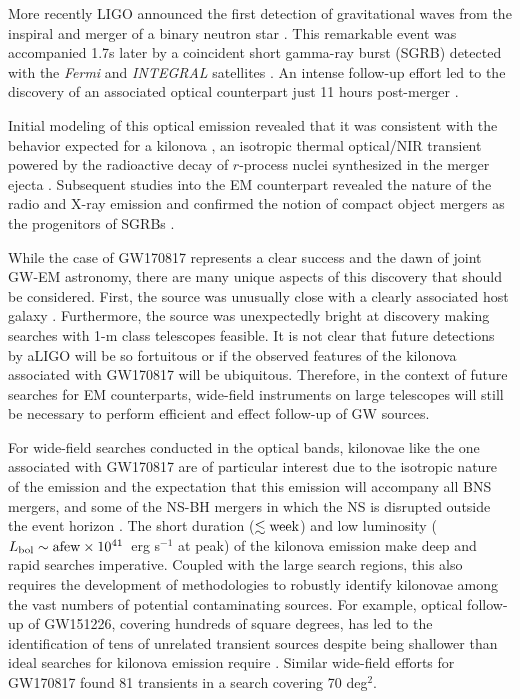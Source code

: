 More recently LIGO announced the first detection of gravitational waves from the inspiral and merger of a binary neutron star \citep[GW170817][]{gw170817}. This remarkable event was accompanied 1.7s later by a coincident short gamma-ray burst (SGRB) detected with the {\it Fermi} and {\it INTEGRAL} satellites \citep{ligogrb,ligofermi,ligointegral}. An intense follow-up effort led to the discovery of an associated optical counterpart just 11 hours post-merger \citep{mmapaper,gw170817lco,gw170817swope,ss+17,gw170817dlt40}.

Initial modeling of this optical emission revealed that it was consistent with the behavior expected for a kilonova \citep{cowp17, kilpatrick17, tanaka17, villar17}, an isotropic thermal optical/NIR transient powered by the radioactive decay of $r$-process nuclei synthesized in the merger ejecta \citep[see e.g.,][]{metzger12,kasen+13,barnes13,metzger17}. Subsequent studies into the EM counterpart revealed the nature of the radio and X-ray emission \citep{alexander17,davanzo18,margutti17,margutti18,mooley18,troja17} and confirmed the notion of compact object mergers as the progenitors of SGRBs \citep{fong13, berger14, fong+15,fong17}.

While the case of GW170817 represents a clear success and the dawn of joint GW-EM astronomy, there are many unique aspects of this discovery that should be considered. First, the source was unusually close \citep[$D \approx 40$~Mpc,][]{gw170817} with a clearly associated host galaxy \citep[NGC 4993,][]{blanchard17,cantiello18}. Furthermore, the source was unexpectedly bright at discovery \citep[$m_i \approx 17.5$~mag,][]{mmapaper,gw170817lco,gw170817swope,ss+17,gw170817dlt40} making searches with 1-m class telescopes feasible. It is not clear that future detections by aLIGO will be so fortuitous or if the observed features of the kilonova associated with GW170817 will be ubiquitous. Therefore, in the context of future searches for EM counterparts, wide-field instruments on large telescopes will still be necessary to perform efficient and effect follow-up of GW sources. 

For wide-field searches conducted in the optical bands, kilonovae like the one associated with GW170817 are of particular interest due to the isotropic nature of the emission and the expectation that this emission will accompany all BNS mergers, and some of the NS-BH mergers in which the NS is disrupted outside the event horizon \citep{metzger12}. The short duration ($\lesssim {\rm week}$) and low luminosity ($L_{\rm bol} \sim {\rm a few} \times 10^{41}$~erg s$^{-1}$ at peak) of the kilonova emission make deep and rapid searches imperative. Coupled with the large search regions, this also requires the development of methodologies to robustly identify kilonovae among the vast numbers of potential contaminating sources. For example, optical follow-up of GW151226, covering hundreds of square degrees, has led to the identification of tens of unrelated transient sources despite being shallower than ideal searches for kilonova emission require \citep[e.g.,][]{cenko15,cenko16,smartt+16b}. Similar wide-field efforts for GW170817 \citep[e.g., DECam][]{ss+17} found 81 transients in a search covering 70 deg$^2$.

